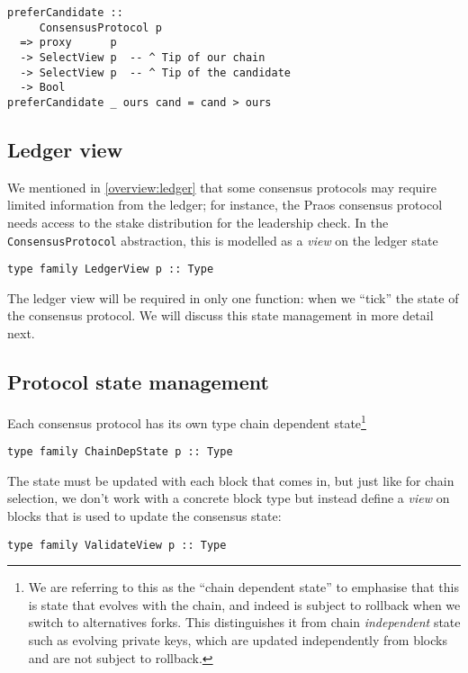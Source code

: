 \begin{lstlisting}
preferCandidate ::
     ConsensusProtocol p
  => proxy      p
  -> SelectView p  -- ^ Tip of our chain
  -> SelectView p  -- ^ Tip of the candidate
  -> Bool
preferCandidate _ ours cand = cand > ours
\end{lstlisting}

\subsection{Ledger view}
\label{consensus:class:ledgerview}

We mentioned in \cref{overview:ledger} that some consensus protocols may require
limited information from the ledger; for instance, the Praos consensus protocol
needs access to the stake distribution for the leadership check. In the
\lstinline!ConsensusProtocol! abstraction, this is modelled as a \emph{view}
on the ledger state

\begin{lstlisting}
type family LedgerView p :: Type
\end{lstlisting}

The ledger view will be required in only one function: when we ``tick'' the
state of the consensus protocol. We will discuss this state management in more
detail next.

\subsection{Protocol state management}
\label{consensus:class:state}

Each consensus protocol has its own type chain dependent state\footnote{We are
referring to this as the ``chain dependent state'' to emphasise that this is
state that evolves with the chain, and indeed is subject to rollback when we
switch to alternatives forks. This distinguishes it from chain
\emph{independent} state such as evolving private keys, which are updated
independently from blocks and are not subject to rollback.}

\begin{lstlisting}
type family ChainDepState p :: Type
\end{lstlisting}

The state must be updated with each block that comes in, but just like for
chain selection, we don't work with a concrete block type but instead define a
\emph{view} on blocks that is used to update the consensus state:

\begin{lstlisting}
type family ValidateView p :: Type
\end{lstlisting}

